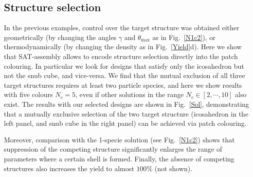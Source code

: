 \documentclass[a4paper, amsfonts, amssymb, amsmath, reprint, showkeys, nofootinbib, oneside]{revtex4-1}
\begin{document}
\subsection{Structure selection}

In the previous examples, control over the target structure was obtained either geometrically (by changing the angles $\gamma$ and $\theta_\text{max}$ as in Fig.~\ref{N1c2}), or thermodynamically (by changing the density as in Fig.~\ref{Yield}d). Here we show that SAT-assembly allows to encode structure selection directly into the patch colouring. In particular we look for designs that satisfy only the icosahedron but not the snub cube, and vice-versa. We find that the mutual exclusion of all three target structures requires at least two particle species, and here we show results with five colours $N_c=5$, even if other solutions in the range $N_c\in\left[2,\cdots,10\right]$ also exist. The results with our selected designs are shown in Fig.~\ref{Sol}, demonstrating that a mutually exclusive selection of the two target structure (icosahedron in the left panel, and snub cube in the right panel) can be achieved via patch colouring.



Moreover, comparison with the 1-specie solution (see Fig.~\ref{N1c2}) shows that suppression of the competing structure significantly enlarges the range of parameters where a certain shell is formed. Finally, the absence of competing structures also increases the yield to almost $100\%$ (not shown).
\end{document}
